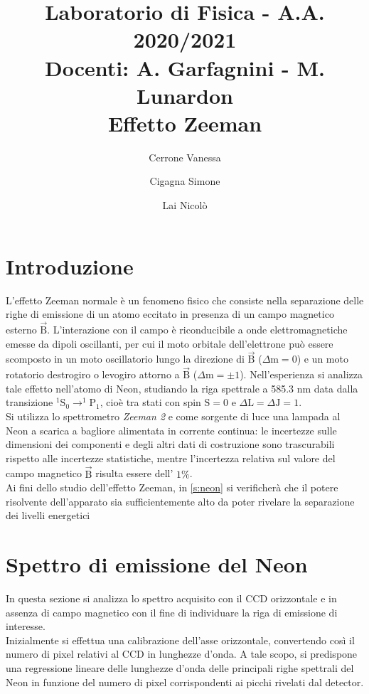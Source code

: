 \documentclass[twocolumn,10pt]{asme2ej}
\date{}
\title{{\huge\bfseries Laboratorio di Fisica} - {\LARGE A.A. 2020/2021} \\ 
    {\LARGE Docenti: A. Garfagnini - M. Lunardon} \\ {\Huge\bfseries Effetto Zeeman}}
\author{Cerrone Vanessa
    \affiliation{
    1200361\\
    vanessa.cerrone@studenti.unipd.it
    }	
}
\author{Cigagna Simone
    \affiliation{
	1193992\\
    simone.cigagna@studenti.unipd.it
    }	
}
\author{Lai Nicolò
    \affiliation{
	1193976\\
    nicolo.lai@studenti.unipd.it
    }	
}
\begin{document}
\maketitle    


\section{Introduzione}\label{s:introduzione}

L'effetto Zeeman normale è un fenomeno fisico che consiste nella separazione delle righe di emissione di un atomo
eccitato in presenza di un campo magnetico esterno $\vec{\text{B}}$. L'interazione con il campo è riconducibile a onde
elettromagnetiche emesse da dipoli oscillanti, per cui il moto orbitale dell'elettrone può essere scomposto in un moto
oscillatorio lungo la direzione di $\vec{\text{B}}$ ($\Delta \text{m} = 0$) e un moto rotatorio destrogiro o levogiro
attorno a $\vec{\text{B}}$ ($\Delta \text{m} = \pm1$). Nell'esperienza si analizza tale effetto nell'atomo di Neon,
studiando la riga spettrale a 585.3 \si{\nano \metre} data dalla transizione $ ^1\text{S}_0 \rightarrow ^1\text{P}_1$,
cioè tra stati con spin $\text{S} = 0$ e $\Delta \text{L}= \Delta \text{J} = 1$. \\
Si utilizza lo spettrometro \textit{Zeeman 2} e come sorgente di luce una lampada al Neon a scarica a bagliore
alimentata in corrente continua: le incertezze sulle dimensioni dei componenti e degli altri dati di costruzione sono
trascurabili rispetto alle incertezze statistiche, mentre l'incertezza relativa sul valore del campo magnetico
$\vec{\text{B}}$ risulta essere dell' $1\%$.   \\

Ai fini dello studio dell'effetto Zeeman, in \autoref{s:neon} si verificherà che il potere risolvente dell'apparato sia sufficientemente
alto da poter rivelare la separazione dei livelli energetici 




\section{Spettro di emissione del Neon}\label{s:neon}

In questa sezione si analizza lo spettro acquisito con il CCD orizzontale e in assenza di campo magnetico con il fine di
individuare la riga di emissione di interesse.  \\
Inizialmente si effettua una calibrazione dell'asse orizzontale, convertendo così il numero di pixel relativi al CCD in
lunghezze d'onda. A tale scopo, si predispone una regressione lineare delle lunghezze d'onda delle principali righe
spettrali del Neon in funzione del numero di pixel corrispondenti ai picchi rivelati dal detector. 
 
\end{document}
